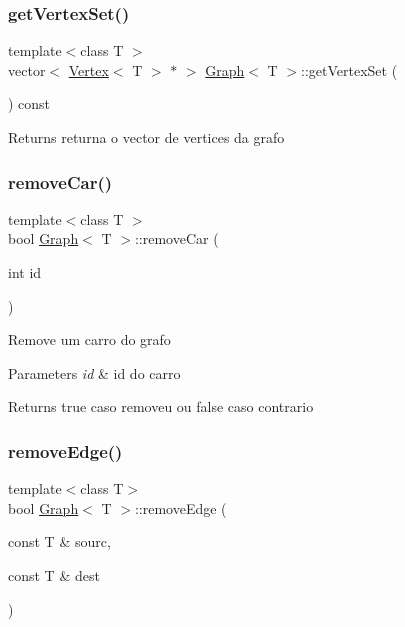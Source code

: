 \subsubsection{\texorpdfstring{get\+Vertex\+Set()}{getVertexSet()}}
{\footnotesize\ttfamily template$<$class T $>$ \\
vector$<$ \mbox{\hyperlink{class_vertex}{Vertex}}$<$ T $>$ $\ast$ $>$ \mbox{\hyperlink{class_graph}{Graph}}$<$ T $>$\+::get\+Vertex\+Set (\begin{DoxyParamCaption}{ }\end{DoxyParamCaption}) const}

\begin{DoxyReturn}{Returns}
returna o vector de vertices da grafo 
\end{DoxyReturn}
\mbox{\label{class_graph_aceb3c6d581c1e0482a9309dd5355ce5c}} 
\subsubsection{\texorpdfstring{remove\+Car()}{removeCar()}}
{\footnotesize\ttfamily template$<$class T $>$ \\
bool \mbox{\hyperlink{class_graph}{Graph}}$<$ T $>$\+::remove\+Car (\begin{DoxyParamCaption}\item[{int}]{id }\end{DoxyParamCaption})}

Remove um carro do grafo 
\begin{DoxyParams}{Parameters}
{\em id} & id do carro \\
\hline
\end{DoxyParams}
\begin{DoxyReturn}{Returns}
true caso removeu ou false caso contrario 
\end{DoxyReturn}
\mbox{\label{class_graph_a1106092a37366486cf55576f9ec01692}} 
\subsubsection{\texorpdfstring{remove\+Edge()}{removeEdge()}}
{\footnotesize\ttfamily template$<$class T$>$ \\
bool \mbox{\hyperlink{class_graph}{Graph}}$<$ T $>$\+::remove\+Edge (\begin{DoxyParamCaption}\item[{const T \&}]{sourc,  }\item[{const T \&}]{dest }\end{DoxyParamCaption})}

